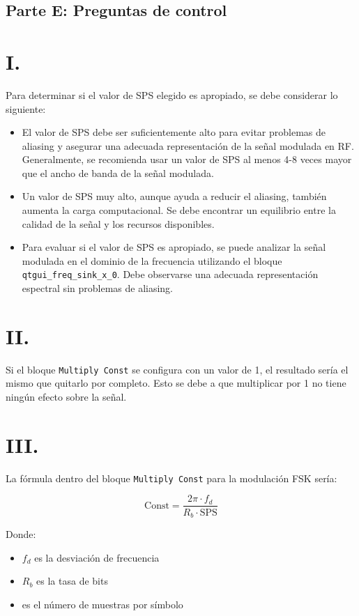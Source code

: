 \documentclass{journal}[IEEEtran, twocolumn]             %
\begin{document}
\begin{multicols}{2}
{\subsection{Parte E: Preguntas de control}

\section*{I.}
Para determinar si el valor de SPS elegido es apropiado, se debe considerar lo siguiente:

\begin{itemize}
    \item El valor de SPS debe ser suficientemente alto para evitar problemas de aliasing y asegurar una adecuada representación de la señal modulada en RF. Generalmente, se recomienda usar un valor de SPS al menos 4-8 veces mayor que el ancho de banda de la señal modulada.
    \item Un valor de SPS muy alto, aunque ayuda a reducir el aliasing, también aumenta la carga computacional. Se debe encontrar un equilibrio entre la calidad de la señal y los recursos disponibles.
    \item Para evaluar si el valor de SPS es apropiado, se puede analizar la señal modulada en el dominio de la frecuencia utilizando el bloque \texttt{qtgui\_freq\_sink\_x\_0}. Debe observarse una adecuada representación espectral sin problemas de aliasing.
\end{itemize}

\section*{II.}
Si el bloque \texttt{Multiply Const} se configura con un valor de 1, el resultado sería el mismo que quitarlo por completo. Esto se debe a que multiplicar por 1 no tiene ningún efecto sobre la señal.

\section*{III.}
La fórmula dentro del bloque \texttt{Multiply Const} para la modulación FSK sería:

\[
\text{Const} = \frac{2 \pi \cdot f_d}{R_b \cdot \text{SPS}}
\]

Donde:
\begin{itemize}
    \item $f_d$ es la desviación de frecuencia
    \item $R_b$ es la tasa de bits
    \item {} es el número de muestras por símbolo
\end{itemize}

}
\end{multicols}
\end{document}

